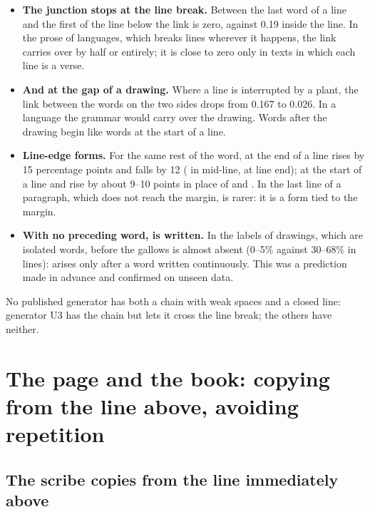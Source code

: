 \begin{itemize}
\item \textbf{The junction stops at the line break.} Between the last word of a line and the first of the line below the
  link is zero, against 0.19 inside the line. In the prose of languages, which breaks lines wherever it happens, the link
  carries over by half or entirely; it is close to zero only in texts in which each line is a verse.
\item \textbf{And at the gap of a drawing.} Where a line is interrupted by a plant, the link between the words on the two
  sides drops from 0.167 to 0.026. In a language the grammar would carry over the drawing. Words after the drawing begin
  like words at the start of a line.
\item \textbf{Line-edge forms.} For the same rest of the word, at the end of a line  rises by 15 percentage
  points and  falls by 12 ( in mid-line,  at line end); at the start of a line  and
   rise by about 9--10 points in place of  and . In the last line of a paragraph, which does not
  reach the margin,  is rarer: it is a form tied to the margin.
\item \textbf{With no preceding word,  is written.} In the labels of drawings, which are isolated words,
   before the gallows is almost absent (0--5\% against 30--68\% in lines):  arises only after a word
  written continuously. This was a prediction made in advance and confirmed on unseen data.
\end{itemize}
No published generator has both a chain with weak spaces and a closed line: generator U3 has the chain but lets it cross
the line break; the others have neither.

\section{The page and the book: copying from the line above, avoiding repetition}

\subsection{The scribe copies from the line immediately above}

